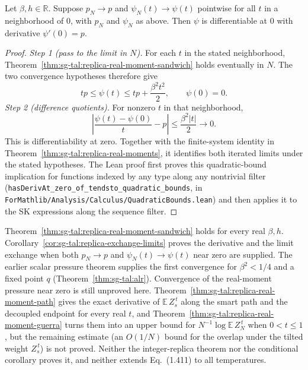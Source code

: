 \begin{corollary}\label{cor:sg-tal:replica-exchange-limits}
\leanok
{}
Let $\beta,h\in\mathbb R$. Suppose $p_N \to p$ and $\psi_N(t) \to \psi(t)$ pointwise for all $t$ in a neighborhood of $0$, with $p_N$ and $\psi_N$ as above.
Then $\psi$ is differentiable at $0$ with derivative $\psi'(0) = p$.
\end{corollary}
\begin{proof}
\leanok
\emph{Step 1 (pass to the limit in $N$).} For each $t$ in the stated neighborhood,
Theorem~\ref{thm:sg-tal:replica-real-moment-sandwich} holds eventually in $N$. The two
convergence hypotheses therefore give
\[
tp\le\psi(t)\le tp+\frac{\beta^2t^2}{2},\qquad \psi(0)=0.
\]
\emph{Step 2 (difference quotients).} For nonzero $t$ in that neighborhood,
\[
\left|\frac{\psi(t)-\psi(0)}t-p\right|\le\frac{\beta^2|t|}{2}\longrightarrow0.
\]
This is differentiability at zero. Together with the finite-system identity in
Theorem~\ref{thm:sg-tal:replica-real-moments}, it identifies both iterated limits under
the stated hypotheses. The Lean proof first proves this quadratic-bound implication
for functions indexed by any type along any nontrivial filter
(\texttt{hasDerivAt\_zero\_of\_tendsto\_quadratic\_bounds}, in
\texttt{ForMathlib/Analysis/Calculus/QuadraticBounds.lean}) and then applies it to the SK
expressions along the sequence filter.
\end{proof}

\begin{remark}\label{rem:sg-tal:replica-real-moment-status}
Theorem~\ref{thm:sg-tal:replica-real-moment-sandwich} holds for every real $\beta,h$.
Corollary~\ref{cor:sg-tal:replica-exchange-limits} proves the derivative and the limit
exchange when both $p_N\to p$ and $\psi_N(t)\to\psi(t)$ near zero are supplied.
The earlier scalar pressure theorem supplies the first convergence for $\beta^2<1/4$
and a fixed point $q$ (Theorem~\ref{thm:sg-tal:alr}). Convergence of the real-moment
pressure near zero is still unproved here. Theorem~\ref{thm:sg-tal:replica-real-moment-path}
gives the exact derivative of $\mathbb E\,Z_s^{\,t}$ along the smart path and the decoupled
endpoint for every real $t$, and Theorem~\ref{thm:sg-tal:replica-real-moment-guerra} turns
them into an upper bound for $N^{-1}\log\mathbb E\,Z_N^{\,t}$ when $0<t\le1$, but the
remaining estimate (an $O(1/N)$ bound for the overlap
under the tilted weight $Z_s^{\,t}$) is not proved. Neither the integer-replica theorem nor
the conditional corollary proves it, and neither extends Eq.~(1.411) to all temperatures.
\end{remark}

